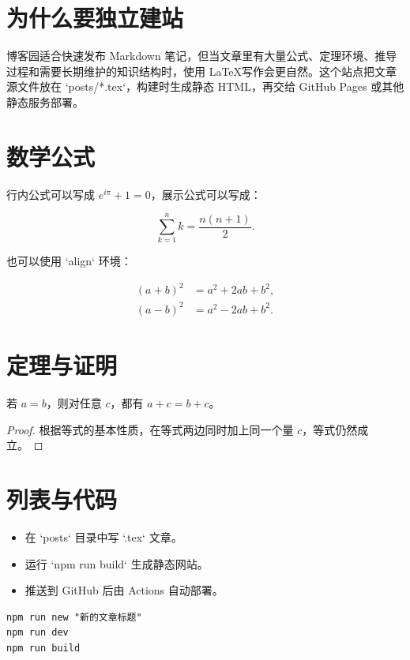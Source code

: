 
\section{为什么要独立建站}

博客园适合快速发布 Markdown 笔记，但当文章里有大量公式、定理环境、推导过程和需要长期维护的知识结构时，使用 \LaTeX 写作会更自然。这个站点把文章源文件放在 `posts/*.tex`，构建时生成静态 HTML，再交给 GitHub Pages 或其他静态服务部署。

\begin{abstract}
这个示例展示了文章元信息、章节、行内公式、展示公式、定理环境、列表和代码块。
\end{abstract}

\section{数学公式}

行内公式可以写成 $e^{i\pi}+1=0$，展示公式可以写成：

\[
  \sum_{k=1}^{n} k = \frac{n(n+1)}{2}.
\]

也可以使用 `align` 环境：

\begin{align}
  (a+b)^2 &= a^2 + 2ab + b^2,\\
  (a-b)^2 &= a^2 - 2ab + b^2.
\end{align}

\section{定理与证明}

\begin{theorem}[等式的平移]
若 $a=b$，则对任意 $c$，都有 $a+c=b+c$。
\end{theorem}

\begin{proof}
根据等式的基本性质，在等式两边同时加上同一个量 $c$，等式仍然成立。
\end{proof}

\section{列表与代码}

\begin{itemize}
\item 在 `posts` 目录中写 `.tex` 文章。
\item 运行 `npm run build` 生成静态网站。
\item 推送到 GitHub 后由 Actions 自动部署。
\end{itemize}

\begin{verbatim}
npm run new "新的文章标题"
npm run dev
npm run build
\end{verbatim}
